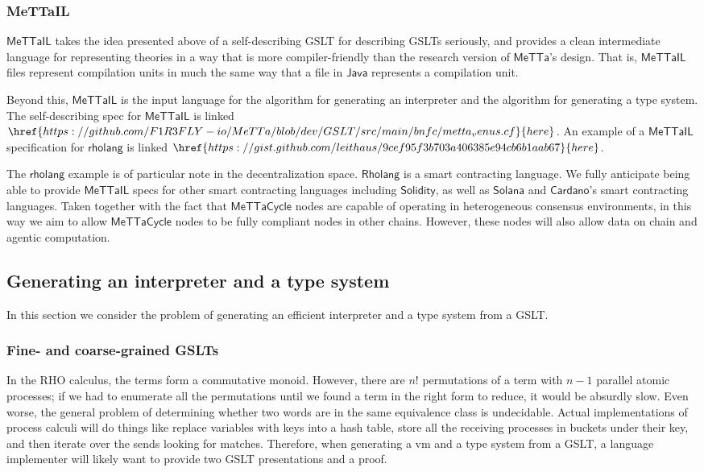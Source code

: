 \documentclass{article}
\newcommand{\MC}{\mathsf{MeTTaCycle}}
\begin{document}
\subsubsection{MeTTaIL}

$\mathsf{MeTTaIL}$ takes the idea presented above of a self-describing
GSLT for describing GSLTs seriously, and provides a clean intermediate
language for representing theories in a way that is more
compiler-friendly than the research version of $\mathsf{MeTTa}$'s
design. That is, $\mathsf{MeTTaIL}$ files represent compilation units
in much the same way that a file in $\mathsf{Java}$ represents a
compilation unit.

Beyond this, $\mathsf{MeTTaIL}$ is the input language for the
algorithm for generating an interpreter and the algorithm for
generating a type system. The self-describing spec for
$\mathsf{MeTTaIL}$ is
linked $\href{https://github.com/F1R3FLY-io/MeTTa/blob/dev/GSLT/src/main/bnfc/metta_venus.cf}{here}$. An example of a $\mathsf{MeTTaIL}$ specification for $\mathsf{rholang}$ is linked $\href{https://gist.github.com/leithaus/9cef95f3b703a406385e94cb6b1aab67}{here}$.

The $\mathsf{rholang}$ example is of particular note in the
decentralization space. $\mathsf{Rholang}$ is a smart contracting
language. We fully anticipate being able to provide $\mathsf{MeTTaIL}$
specs for other smart contracting languages including
$\mathsf{Solidity}$, as well as $\mathsf{Solana}$ and
$\mathsf{Cardano}$'s smart contracting languages. Taken together with
the fact that $\MC$ nodes are capable of operating in heterogeneous
consensus environments, in this way we aim to allow $\MC$ nodes to be
fully compliant nodes in other chains. However, these nodes will also
allow data on chain and agentic computation.

\subsection{Generating an interpreter and a type system}
\label{Generating an interpreter and a type system}

In this section we consider the problem of generating an efficient interpreter and a type system from a GSLT.

\subsubsection{Fine- and coarse-grained GSLTs}
In the RHO calculus, the terms form a commutative monoid.  However, there are $n!$ permutations of a term with $n-1$ parallel atomic processes; if we had to enumerate all the permutations until we found a term in the right form to reduce, it would be absurdly slow.  Even worse, the general problem of determining whether two words are in the same equivalence class is undecidable.  Actual implementations of process calculi will do things like replace variables with keys into a hash table, store all the receiving processes in buckets under their key, and then iterate over the sends looking for matches.  Therefore, when generating a vm and a type system from a GSLT, a language implementer will likely want to provide two GSLT presentations and a proof.
\end{document}
